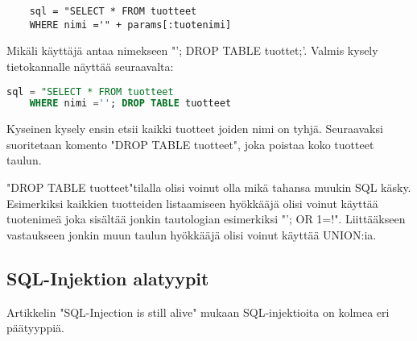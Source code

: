\documentclass[finnish]{tktltiki2}
\theoremstyle{definition}
\theoremstyle{remark}
\begin{document}
	\begin{lstlisting}
	sql = "SELECT * FROM tuotteet
	WHERE nimi ='" + params[:tuotenimi]
	\end{lstlisting}
	
	Mikäli käyttäjä antaa nimekseen "'; DROP TABLE tuottet;'. Valmis kysely tietokannalle näyttää seuraavalta:
	
	\begin{lstlisting}[language=sql]
	sql = "SELECT * FROM tuotteet
	WHERE nimi =''; DROP TABLE tuotteet                             
	\end{lstlisting}
	
	Kyseinen kysely ensin etsii kaikki tuotteet joiden nimi on tyhjä. Seuraavaksi suoritetaan komento "DROP TABLE tuotteet", joka poistaa koko tuotteet taulun.
	
	"DROP TABLE tuotteet"\space tilalla olisi voinut olla mikä tahansa muukin SQL käsky. Esimerkiksi kaikkien tuotteiden listaamiseen hyökkääjä olisi voinut käyttää tuotenimeä joka sisältää jonkin tautologian esimerkiksi "'; OR 1=!". Liittääkseen vastaukseen jonkin muun taulun hyökkääjä olisi voinut käyttää UNION:ia.
	
	\subsection{SQL-Injektion alatyypit}
	Artikkelin "SQL-Injection is still alive"  mukaan SQL-injektioita on kolmea eri päätyyppiä\cite{still-alive}.
	
\end{document}
